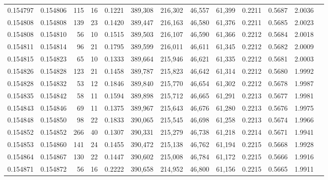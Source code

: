 \begin{tabular}{rrrrrrrrrrrrr}
0.154797 & 0.154806 &   115 &  16 &                                     0.1221 & 389,308 & 216,302 &  46,557 &  61,399 & 0.2211 & 0.5687 & 2.0036 \\
0.154808 & 0.154808 &   139 &  23 &                                     0.1420 & 389,447 & 216,163 &  46,580 &  61,376 & 0.2211 & 0.5685 & 2.0023 \\
0.154808 & 0.154810 &    56 &  10 &                                     0.1515 & 389,503 & 216,107 &  46,590 &  61,366 & 0.2212 & 0.5684 & 2.0018 \\
0.154811 & 0.154814 &    96 &  21 &                                     0.1795 & 389,599 & 216,011 &  46,611 &  61,345 & 0.2212 & 0.5682 & 2.0009 \\
0.154815 & 0.154823 &    65 &  10 &                                     0.1333 & 389,664 & 215,946 &  46,621 &  61,335 & 0.2212 & 0.5681 & 2.0003 \\
0.154826 & 0.154828 &   123 &  21 &                                     0.1458 & 389,787 & 215,823 &  46,642 &  61,314 & 0.2212 & 0.5680 & 1.9992 \\
0.154828 & 0.154832 &    53 &  12 &                                     0.1846 & 389,840 & 215,770 &  46,654 &  61,302 & 0.2212 & 0.5678 & 1.9987 \\
0.154835 & 0.154842 &    58 &  11 &                                     0.1594 & 389,898 & 215,712 &  46,665 &  61,291 & 0.2213 & 0.5677 & 1.9981 \\
0.154843 & 0.154846 &    69 &  11 &                                     0.1375 & 389,967 & 215,643 &  46,676 &  61,280 & 0.2213 & 0.5676 & 1.9975 \\
0.154848 & 0.154850 &    98 &  22 &                                     0.1833 & 390,065 & 215,545 &  46,698 &  61,258 & 0.2213 & 0.5674 & 1.9966 \\
0.154852 & 0.154852 &   266 &  40 &                                     0.1307 & 390,331 & 215,279 &  46,738 &  61,218 & 0.2214 & 0.5671 & 1.9941 \\
0.154853 & 0.154860 &   141 &  24 &                                     0.1455 & 390,472 & 215,138 &  46,762 &  61,194 & 0.2215 & 0.5668 & 1.9928 \\
0.154864 & 0.154867 &   130 &  22 &                                     0.1447 & 390,602 & 215,008 &  46,784 &  61,172 & 0.2215 & 0.5666 & 1.9916 \\
0.154871 & 0.154872 &    56 &  16 &                                     0.2222 & 390,658 & 214,952 &  46,800 &  61,156 & 0.2215 & 0.5665 & 1.9911 \\

\end{tabular}

